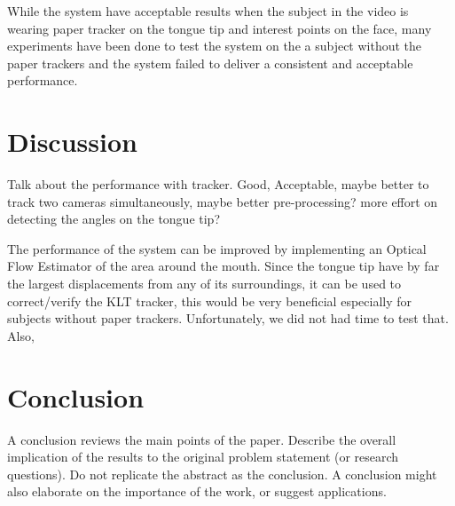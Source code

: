 \documentclass[journal]{IEEEtran}
\begin{document}
While the system have acceptable results when the subject in the video is wearing paper tracker on the tongue tip and interest points on the face, many experiments have been done to test the system on the a subject without the paper trackers and the system failed to deliver a consistent and acceptable performance.
\section{Discussion}
Talk about the performance with tracker. Good, Acceptable, maybe better to track two cameras simultaneously, maybe better pre-processing? more effort on detecting the angles on the tongue tip?

The performance of the system can be improved by implementing an Optical Flow Estimator of the area around the mouth. Since the tongue tip have by far the largest displacements from any of its surroundings, it can be used to correct/verify the KLT tracker, this would be very beneficial especially for subjects without paper trackers. Unfortunately, we did not had time to test that. Also, 
\section{Conclusion}
A conclusion reviews the main points of the paper. Describe the overall implication of the results to the original problem statement (or research questions). Do not replicate the abstract as the conclusion. A conclusion might also elaborate on the importance of the work, or suggest applications.



\end{document}
